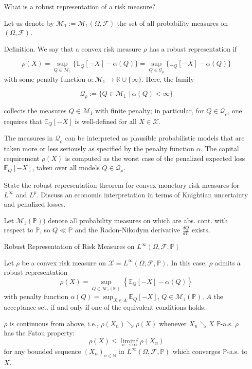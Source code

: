 What is a robust representation of a risk measure?

Let us denote by \( \mathcal{M}_1 := \mathcal{M}_1(\Omega, \mathcal{F}) \) the set of all probability measures on \( (\Omega, \mathcal{F}) \).

Definition.
We say that a convex risk measure \( \rho \) has a robust representation if

\[
\rho(X) = \sup_{Q \in \mathcal{M}_1} \{ \mathbb{E}_Q[-X] - \alpha(Q) \} = \sup_{Q \in \mathcal{Q}_\rho} \{ \mathbb{E}_Q[-X] - \alpha(Q) \}
\]
with some penalty function \( \alpha : \mathcal{M}_1 \to \mathbb{R} \cup \{ \infty \} \). Here, the family

\[
\mathcal{Q}_\rho := \{ Q \in \mathcal{M}_1 \mid \alpha(Q) < \infty \}
\]

collects the measures \( Q \in \mathcal{M}_1 \) with finite penalty; in particular, for \(  Q \in \mathcal{Q}_\rho \), one requires that \( \mathbb{E}_Q[-X] \) 
is well-defined for all \( X \in \mathcal{X}. \) 

The measures in \(\mathcal{Q}_\rho\) can be interpreted as plausible probabilistic models that are taken more or less seriously as specified by the penalty function \(\alpha\).
The capital requirement \(\rho(X)\) is computed as the worst case of the penalized expected loss \(\mathbb{E}_Q[-X]\), taken over all models \(Q \in \mathcal{Q}_\rho\).


State the robust representation theorem for convex monetary risk measures for \( L^\infty \)
and \( L^p \). Discuss an economic interpretation in terms of Knightian uncertainty and
penalized losses.

Let \( \mathcal{M}_1(\mathbb{P}) ) \) denote all probability measures on which are abs. cont. with respect to \( \mathbb{P} \), so \( Q \ll \mathbb{P} \)
and the Radon-Nikodym derivative \( \frac{dQ}{d\mathbb{P}} \) exists.

Robust Representation of Risk Measures on \( L^\infty(\Omega, \mathcal{F}, \mathbb{P}) \)

Let \(\rho\) be a convex risk measure on \(\mathcal{X} = L^\infty(\Omega, \mathcal{F}, \mathbb{P})\). In this case, \(\rho\) admits a robust representation
\[
\rho(X) = \sup_{Q \in \mathcal{M}_1(\mathbb{P})} \left\{ \mathbb{E}_Q[-X] - \alpha(Q) \right\}
\]
with penalty function \(\alpha(Q) = \sup_{X \in A} \mathbb{E}_Q[-X]\), \(Q \in \mathcal{M}_1(\mathbb{P})\), \( A \) the acceptance set.
if and only if one of the equivalent conditions holds:

 \(\rho\) is continuous from above, i.e., \(\rho(X_n) \searrow \rho(X)\) whenever \(X_n \searrow X\) \(\mathbb{P}\)-a.s.
 \(\rho\) has the Fatou property:
\[
\rho(X) \leq \liminf_{n \to \infty} \rho(X_n)
\]
for any bounded sequence \((X_n)_{n \in \mathbb{N}}\) in \(L^\infty(\Omega, \mathcal{F}, \mathbb{P})\) which converges \(\mathbb{P}\)-a.s. to \(X\).

